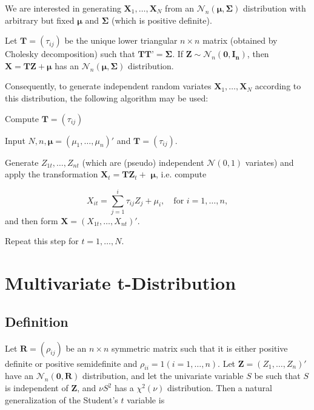 We are interested in generating $\textbf{X}_1,\ldots, \textbf{X}_N$ from an  $\mathcal{N}_n(\boldsymbol{\mu}, \boldsymbol{\Sigma})$ distribution with arbitrary but fixed $\boldsymbol{\mu}$ and $\boldsymbol{\Sigma}$ (which is positive definite).

Let $\textbf{T} = (\tau_{ij})$ be the unique lower triangular $n \times n$ matrix (obtained by Cholesky decomposition) such that $\textbf{TT'} = \boldsymbol{\Sigma}$.
If  $\textbf{Z} \sim \mathcal{N}_n(\boldsymbol{0}, \boldsymbol{I_n})$, then $\textbf{X} = \textbf{TZ} + \boldsymbol{\mu}$ has an  $\mathcal{N}_n(\boldsymbol{\mu}, \boldsymbol{\Sigma})$ distribution. 

Consequently, to generate independent random variates $\textbf{X}_1,\ldots, \textbf{X}_N$ according to this distribution, the following algorithm may be used:


\vpara
Compute $\textbf{T} = (\tau_{ij})$

Input $N, n, \boldsymbol{\mu} =(\mu_1,\ldots,\mu_n)'$ and  $\textbf{T} = (\tau_{ij})$.

Generate $Z_{1t}, \ldots, Z_{nt}$ (which are (pseudo) independent $\mathcal{N}(0,1)$ variates) and apply the transformation $\textbf{X}_t = \textbf{TZ}_t + $ $\boldsymbol{\mu}$, i.e. compute

\begin{equation} 
	X_{it} = \sum_{j=1}^i \tau_{ij} Z_j + \mu_i, \quad \text{for } i=1,\ldots,n,
\end{equation}
and then form $\textbf{X} = (X_{1t},\ldots,X_{nt})'$.

Repeat this step for $t=1,\ldots,N$.




\newpage
\section{Multivariate t-Distribution}


\subsection{Definition}
\label{MultivariateTDistributionDefinition}
Let $\boldsymbol{R} = (\rho_{ij})$ be an $n \times n$ symmetric matrix such that it is either positive definite or positive semidefinite and $\rho_{ii} = 1 (i=1,\ldots,n)$.
Let  $\textbf{Z} = (Z_1,\ldots,Z_{n})'$ have an $\mathcal{N}_n(\boldsymbol{0}, \boldsymbol{R})$ distribution, and let the univariate variable $S$ be such that $S$ is independent of $\boldsymbol{Z}$, and $\nu S^2$ has a $\chi^2(\nu)$ distribution. Then a natural generalization of the Student's $t$ variable is

